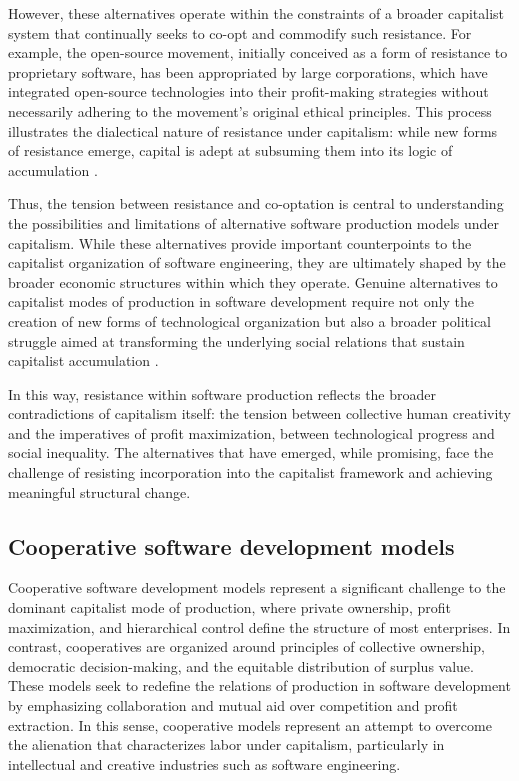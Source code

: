 \begin{refsection}
However, these alternatives operate within the constraints of a broader capitalist system that continually seeks to co-opt and commodify such resistance. For example, the open-source movement, initially conceived as a form of resistance to proprietary software, has been appropriated by large corporations, which have integrated open-source technologies into their profit-making strategies without necessarily adhering to the movement's original ethical principles. This process illustrates the dialectical nature of resistance under capitalism: while new forms of resistance emerge, capital is adept at subsuming them into its logic of accumulation \cite[pp.~152-154]{berardi2012}.

Thus, the tension between resistance and co-optation is central to understanding the possibilities and limitations of alternative software production models under capitalism. While these alternatives provide important counterpoints to the capitalist organization of software engineering, they are ultimately shaped by the broader economic structures within which they operate. Genuine alternatives to capitalist modes of production in software development require not only the creation of new forms of technological organization but also a broader political struggle aimed at transforming the underlying social relations that sustain capitalist accumulation \cite[pp.~32-34]{fuchs2015}.

In this way, resistance within software production reflects the broader contradictions of capitalism itself: the tension between collective human creativity and the imperatives of profit maximization, between technological progress and social inequality. The alternatives that have emerged, while promising, face the challenge of resisting incorporation into the capitalist framework and achieving meaningful structural change.

\subsection{Cooperative software development models}

Cooperative software development models represent a significant challenge to the dominant capitalist mode of production, where private ownership, profit maximization, and hierarchical control define the structure of most enterprises. In contrast, cooperatives are organized around principles of collective ownership, democratic decision-making, and the equitable distribution of surplus value. These models seek to redefine the relations of production in software development by emphasizing collaboration and mutual aid over competition and profit extraction. In this sense, cooperative models represent an attempt to overcome the alienation that characterizes labor under capitalism, particularly in intellectual and creative industries such as software engineering.


\end{refsection}
